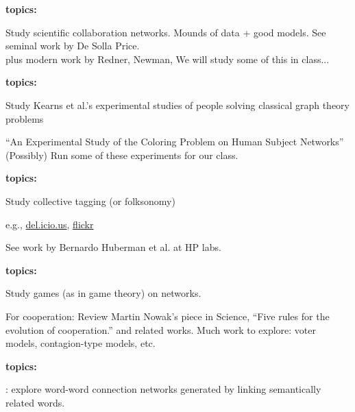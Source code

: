       \textbf{topics:}

    
    
     Study scientific collaboration networks.
     Mounds of data + good models.
     See seminal work by De Solla Price\cite{price1965a}.\\
      plus modern work by Redner, Newman, \etal
     We will study some of this in class...
    
    

  
      \textbf{topics:}
      
    
    
     
      Study Kearns et al.'s experimental studies
      of people solving classical graph theory problems\cite{kearns2006a}
     
      ``An Experimental Study of the Coloring Problem on Human Subject Networks''
      (Possibly) Run some of these experiments for our class.
    
    

  




  \textbf{topics:}

  
  
   
    Study \alert{collective tagging} (or folksonomy)
   
    e.g., \href{http://del.icio.us}{del.icio.us}, \href{http://www.flickr.com}{flickr}
   
    See work by Bernardo Huberman et al. at HP labs.
  
  



  \textbf{topics:}

  
  
  
    Study games (as in game theory) on
    networks.  
  
    For cooperation: Review Martin Nowak's piece in Science,
    ``Five rules for the evolution of cooperation.''\cite{nowak2006a}
    and related works.
   Much work to explore: voter models, contagion-type models, etc.
  
  


  \textbf{topics:}

  
  
  
    : explore word-word
    connection networks generated by linking semantically related words.
  
